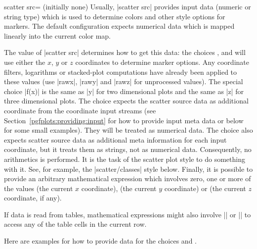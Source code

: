 {\begin{pgfplotskey}{scatter src= (initially none)}
	Usually, |scatter src| provides input data (numeric or string type) which is used to determine colors and other style options for markers.
	The default configuration expects numerical data which is mapped linearly into the current color map.

	The value of |scatter src| determines how to get this data: the choices ,  and  will use either the $x$, $y$ or $z$ coordinates to determine marker options. Any coordinate filters, logarithms or stacked-plot computations have already been applied to these values (use |rawx|, |rawy| and |rawz| for unprocessed values). The special choice |f(x)| is the same as |y| for two dimensional plots and the same as |z| for three dimensional plots. The choice  expects the scatter source data as additional coordinate from the coordinate input streams (see Section~\ref{pgfplots:providing:input} for how to provide input meta data or below for some small examples). They will be treated as numerical data. The choice  also expects scatter source data as additional meta information for each input coordinate, but it treats them as strings,  not as numerical data. Consequently, no arithmetics is performed. It is the task of the scatter plot style to do something with it. See, for example, the |scatter/classes| style below.
	Finally, it is possible to provide an arbitrary mathematical expression which involves zero, one or more of the values  (the current $x$ coordinate),  (the current $y$ coordinate) or  (the current $z$ coordinate, if any).

	If data is read from tables, mathematical expressions might also involve |\thisrow| or |\thisrowno| to access any of the table cells in the current row.

	Here are examples for how to provide data for the choices  and .
\begin{codeexample}
\end{codeexample}
\end{pgfplotskey}}
